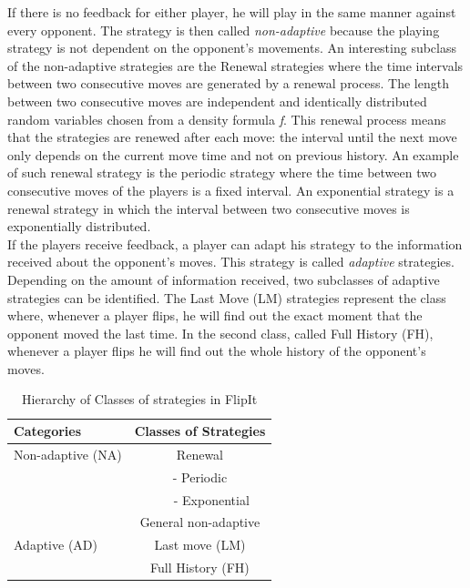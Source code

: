 If there is no feedback for either player, he will play in the same manner against every opponent. The strategy is then called \textit{non-adaptive} because the playing strategy is not dependent on the opponent's movements. An interesting subclass of the non-adaptive strategies are the Renewal strategies where the time intervals between two consecutive moves are generated by a renewal process. The length between two consecutive moves are independent and identically distributed random variables chosen from a density formula \textit{f}. This renewal process means that the strategies are renewed after each move: the interval until the next move only depends on the current move time and not on previous history. 
An example of such renewal strategy is the periodic strategy where the time between two consecutive moves of the players is a fixed interval. An exponential strategy is a renewal strategy in which the interval between two consecutive moves is exponentially distributed. \\

If the players receive feedback, a player can adapt his strategy to the information received about the opponent's moves. This strategy is called \textit{adaptive} strategies. Depending on the amount of information received, two subclasses of adaptive strategies can be identified. The Last Move (LM) strategies represent the class where, whenever a player flips, he will find out the exact moment that the opponent moved the last time. In the second class, called Full History (FH), whenever a player flips he will find out the whole history of the opponent's moves. \\


 \begin{table}
 \centering
 \begin{tabular}{ l | c  }
  \textbf{Categories} & \textbf{Classes of Strategies} \\
  \hline Non-adaptive (NA) & Renewal \\
  & - Periodic \\
  & ~~~ - Exponential \\
  & General non-adaptive \\
  \hline Adaptive (AD) & Last move (LM) \\
  & Full History (FH) \\  
\end{tabular}
 \caption{Hierarchy of Classes of strategies in FlipIt}
 \label{table:Strategies}
 \end{table}

